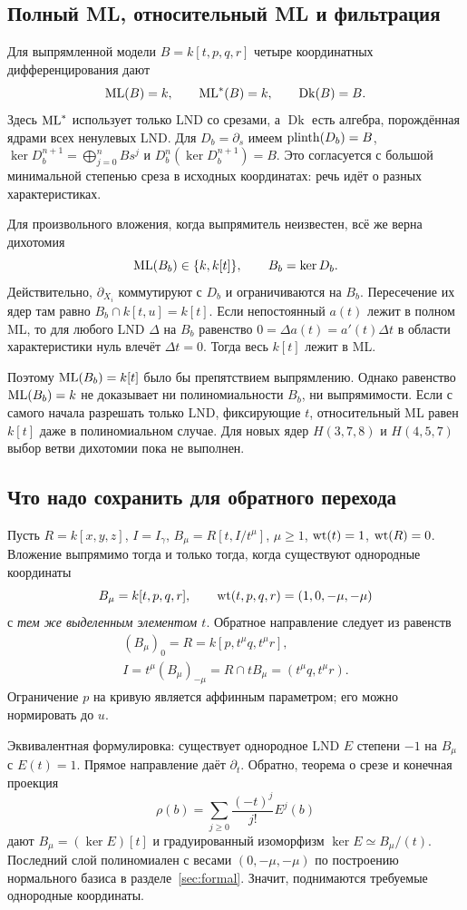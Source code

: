 \subsection{Полный ML, относительный ML и фильтрация}
Для выпрямленной модели $B=k[t,p,q,r]$ четыре координатных
дифференцирования дают
\[
\operatorname{ML}(B)=k,\qquad \operatorname{ML}^*(B)=k,\qquad \operatorname{Dk}(B)=B.
\]
Здесь $\operatorname{ML}^*$ использует только LND со срезами, а $\operatorname{Dk}$
есть алгебра, порождённая ядрами всех ненулевых LND.
Для $D_b=\partial_s$ имеем $\operatorname{plinth}(D_b)=B$,
$\ker D_b^{n+1}=\bigoplus_{j=0}^n Bs^j$ и
$D_b^n(\ker D_b^{n+1})=B$.
Это согласуется с большой минимальной степенью среза в исходных
координатах: речь идёт о разных характеристиках.

Для произвольного вложения, когда выпрямитель неизвестен, всё же верна
дихотомия
\[
\operatorname{ML}(B_b)\in\{k,k[t]\},\qquad B_b=\ker D_b.
\]
Действительно, $\partial_{X_i}$ коммутируют с $D_b$ и ограничиваются
на $B_b$. Пересечение их ядер там равно
$B_b\cap k[t,u]=k[t]$. Если непостоянный $a(t)$ лежит в полном ML,
то для любого LND $\Delta$ на $B_b$ равенство
$0=\Delta a(t)=a'(t)\Delta t$ в области характеристики нуль
влечёт $\Delta t=0$. Тогда весь $k[t]$ лежит в ML.

Поэтому $\operatorname{ML}(B_b)=k[t]$ было бы препятствием выпрямлению.
Однако равенство $\operatorname{ML}(B_b)=k$ не доказывает ни полиномиальности $B_b$,
ни выпрямимости. Если с самого начала разрешать только LND,
фиксирующие $t$, относительный ML равен $k[t]$ даже в полиномиальном
случае. Для новых ядер $H(3,7,8)$ и $H(4,5,7)$ выбор ветви дихотомии
пока не выполнен.

\subsection{Что надо сохранить для обратного перехода}
Пусть $R=k[x,y,z]$, $I=I_\gamma$,
$B_\mu=R[t,I/t^\mu]$, $\mu\ge1$, $\operatorname{wt}(t)=1$, $\operatorname{wt}(R)=0$.
Вложение выпрямимо тогда и только тогда, когда существуют однородные
координаты
\[
B_\mu=k[t,p,q,r],\qquad
\operatorname{wt}(t,p,q,r)=(1,0,-\mu,-\mu)
\]
с \emph{тем же выделенным элементом $t$}. Обратное направление следует
из равенств
\[
\begin{gathered}
(B_\mu)_0=R=k[p,t^\mu q,t^\mu r],\\
I=t^\mu(B_\mu)_{-\mu}=R\cap tB_\mu=(t^\mu q,t^\mu r).
\end{gathered}
\]
Ограничение $p$ на кривую является аффинным параметром; его можно
нормировать до $u$.

Эквивалентная формулировка: существует однородное LND $E$ степени $-1$
на $B_\mu$ с $E(t)=1$. Прямое направление даёт $\partial_t$.
Обратно, теорема о срезе и конечная проекция
\[
\rho(b)=\sum_{j\ge0}\frac{(-t)^j}{j!}E^j(b)
\]
дают $B_\mu=(\ker E)[t]$ и градуированный изоморфизм
$\ker E\simeq B_\mu/(t)$. Последний слой полиномиален с весами
$(0,-\mu,-\mu)$ по построению нормального базиса в разделе~\ref{sec:formal}.
Значит, поднимаются требуемые однородные координаты.

